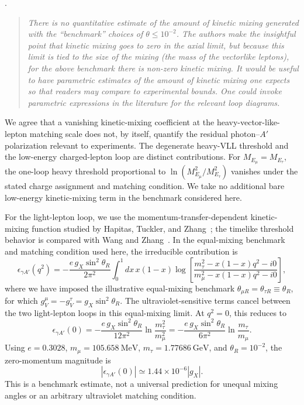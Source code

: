\documentclass[12pt,a4paper]{article}
\begin{document}
\medskip
{}.
\begin{quote}\itshape
There is no quantitative estimate of the amount of kinetic mixing generated with the ``benchmark'' choices of \(\theta\leq10^{-2}\). The authors make the insightful point that kinetic mixing goes to zero in the axial limit, but because this limit is tied to the size of the mixing (the mass of the vectorlike leptons), for the above benchmark there is non-zero kinetic mixing. It would be useful to have parametric estimates of the amount of kinetic mixing one expects so that readers may compare to experimental bounds. One could invoke parametric expressions in the literature for the relevant loop diagrams.
\end{quote}


We agree that a vanishing kinetic-mixing coefficient at the heavy-vector-like-lepton matching scale does not, by itself, quantify the residual photon--\(A'\) polarization relevant to experiments. The degenerate heavy-VLL threshold and the low-energy charged-lepton loop are distinct contributions. For \(M_{E_\mu}=M_{E_\tau}\), the one-loop heavy threshold proportional to \(\ln(M_{E_\mu}^2/M_{E_\tau}^2)\) vanishes under the stated charge assignment and matching condition. We take no additional bare low-energy kinetic-mixing term in the benchmark considered here.

For the light-lepton loop, we use the momentum-transfer-dependent kinetic-mixing function studied by Hapitas, Tuckler, and Zhang~\cite{Hapitas:2021kineticMixing}; the timelike threshold behavior is compared with Wang and Zhang~\cite{Wang:2026supernova}. In the equal-mixing benchmark and matching condition used here, the irreducible contribution is
\[
\epsilon_{\gamma A'}(q^2)=
-\frac{e\,g_X\sin^2\theta_R}{2\pi^2}
\int_0^1 dx\,x(1-x)
\log\!\left[
\frac{m_\tau^2-x(1-x)q^2-i0}
     {m_\mu^2-x(1-x)q^2-i0}
\right],
\]
where we have imposed the illustrative equal-mixing benchmark
\(\theta_{\mu R}=\theta_{\tau R}\equiv\theta_R\), for which
\(g_V^\mu=-g_V^\tau=g_X\sin^2\theta_R\). The ultraviolet-sensitive terms cancel between the two light-lepton loops in this equal-mixing limit. At \(q^2=0\), this reduces to
\[
\epsilon_{\gamma A'}(0)=
-\frac{e\,g_X\sin^2\theta_R}{12\pi^2}
\ln\frac{m_\tau^2}{m_\mu^2}
=-\frac{e\,g_X\sin^2\theta_R}{6\pi^2}
\ln\frac{m_\tau}{m_\mu}.
\]
Using \(e=0.3028\), \(m_\mu=105.658~\mathrm{MeV}\), \(m_\tau=1.77686~\mathrm{GeV}\), and \(\theta_R=10^{-2}\), the zero-momentum magnitude is
\[
|\epsilon_{\gamma A'}(0)|\simeq1.44\times10^{-6}|g_X|.
\]
This is a benchmark estimate, not a universal prediction for unequal mixing angles or an arbitrary ultraviolet matching condition.
\end{document}
